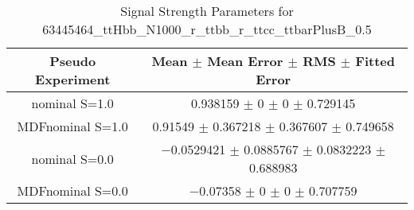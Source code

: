 \begin{table}
\centering
\caption{Signal Strength Parameters for 63445464\_ttHbb\_N1000\_r\_ttbb\_r\_ttcc\_ttbarPlusB\_0.5}
\begin{tabular}{cc}
\toprule
Pseudo Experiment & Mean $\pm$ Mean Error $\pm$ RMS $\pm$ Fitted Error\\
\midrule
nominal S=1.0 & \num{0.938159} $\pm$ \num{0} $\pm$ \num{0} $\pm$ \num{0.729145}\\
MDFnominal S=1.0 & \num{0.91549} $\pm$ \num{0.367218} $\pm$ \num{0.367607} $\pm$ \num{0.749658}\\
nominal S=0.0 & \num{-0.0529421} $\pm$ \num{0.0885767} $\pm$ \num{0.0832223} $\pm$ \num{0.688983}\\
MDFnominal S=0.0 & \num{-0.07358} $\pm$ \num{0} $\pm$ \num{0} $\pm$ \num{0.707759}\\
\bottomrule
\end{tabular}
\end{table}